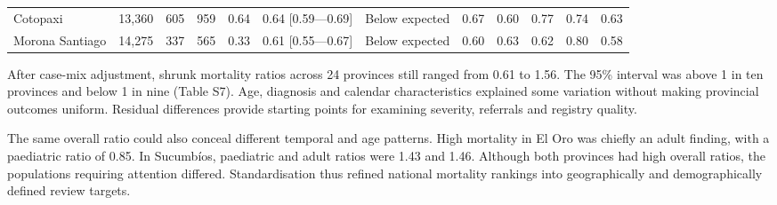 \documentclass[11pt,a4paper]{article}
\begin{document}
\begin{landscape}
\begin{longtable}{@{}L{32.98mm}L{17.67mm}L{12.96mm}L{15.31mm}L{14.14mm}L{35.34mm}L{24.74mm}L{16.49mm}L{16.49mm}L{16.49mm}L{16.49mm}L{16.49mm}@{}}
Cotopaxi & 13,360 & 605 & 959 & 0.64 & 0.64 [0.59—0.69] & Below expected & 0.67 & 0.60 & 0.77 & 0.74 & 0.63 \\
Morona Santiago & 14,275 & 337 & 565 & 0.33 & 0.61 [0.55—0.67] & Below expected & 0.60 & 0.63 & 0.62 & 0.80 & 0.58 \\
\end{longtable}\endgroup
After case-mix adjustment, shrunk mortality ratios across 24 provinces still ranged from 0.61 to 1.56. The 95\% interval was above 1 in ten provinces and below 1 in nine (Table S7). Age, diagnosis and calendar characteristics explained some variation without making provincial outcomes uniform. Residual differences provide starting points for examining severity, referrals and registry quality.

The same overall ratio could also conceal different temporal and age patterns. High mortality in El Oro was chiefly an adult finding, with a paediatric ratio of 0.85. In Sucumbíos, paediatric and adult ratios were 1.43 and 1.46. Although both provinces had high overall ratios, the populations requiring attention differed. Standardisation thus refined national mortality rankings into geographically and demographically defined review targets.


\end{landscape}
\clearpage
\begingroup\fontsize{8}{9.5}\selectfont\setlength{\tabcolsep}{1.1mm}\renewcommand{\arraystretch}{1.2}
\end{document}
